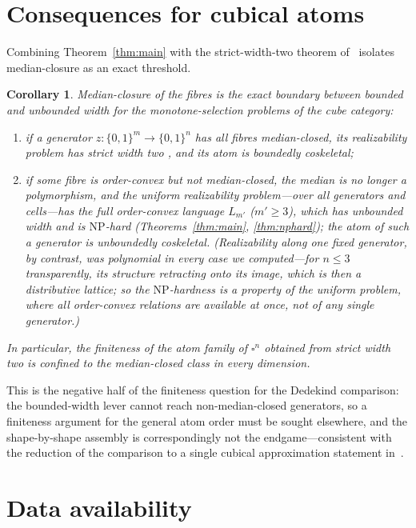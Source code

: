 \documentclass[11pt]{amsart}
\theoremstyle{plain}
\newtheorem{cor}[thm]{Corollary}
\theoremstyle{definition}
\newcommand{\B}{\{0,1\}}
\begin{document}
\section{Consequences for cubical atoms}

Combining Theorem~\ref{thm:main} with the strict-width-two theorem
of~\cite{PaperW} isolates median-closure as an exact threshold.

\begin{cor}\label{cor:boundary}
  Median-closure of the fibres is the exact boundary between bounded
  and unbounded width for the monotone-selection problems of the cube
  category:
  \begin{enumerate}
  \item if a generator $z\colon\B^m\to\B^n$ has all fibres
    median-closed, its realizability problem has strict width two
    \cite{PaperW}, and its atom is boundedly coskeletal;
  \item if some fibre is order-convex but not median-closed, the median
    is no longer a polymorphism, and the \emph{uniform} realizability
    problem---over all generators and cells---has the full order-convex
    language $L_{m'}$ ($m'\ge3$), which has unbounded width and is
    $\mathrm{NP}$-hard (Theorems~\ref{thm:main}, \ref{thm:nphard}); the
    atom of such a generator is unboundedly coskeletal.  (Realizability
    along one \emph{fixed} generator, by contrast, was polynomial in
    every case we computed---for $n\le3$ transparently, its structure
    retracting onto its image, which is then a distributive lattice; so
    the $\mathrm{NP}$-hardness is a property of the uniform problem, where
    all order-convex relations are available at once, not of any single
    generator.)
  \end{enumerate}
  In particular, the finiteness of the atom family of $\square^n$
  obtained from strict width two is confined to the median-closed
  class in every dimension.
\end{cor}

This is the negative half of the finiteness question for the Dedekind
comparison: the bounded-width lever cannot reach non-median-closed
generators, so a finiteness argument for the general atom order must be
sought elsewhere, and the shape-by-shape assembly is correspondingly
not the endgame---consistent with the reduction of the comparison to a
single cubical approximation statement in~\cite{PaperW}.

\section{Data availability}\label{sec:data}
\end{document}
